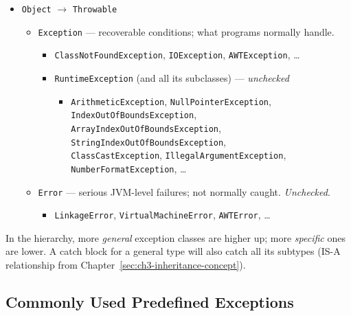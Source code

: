 \documentclass[11pt, a4paper, notitlepage]{report}
\theoremstyle{definition}
\theoremstyle{remark}
\theoremstyle{definition}
\begin{document}
\begin{itemize}
  \item \texttt{Object} $\rightarrow$ \texttt{Throwable}
  \begin{itemize}
    \item \texttt{Exception} --- recoverable conditions; what programs normally handle.
    \begin{itemize}
      \item \texttt{ClassNotFoundException}, \texttt{IOException}, \texttt{AWTException}, \ldots
      \item \texttt{RuntimeException} (and all its subclasses) --- \emph{unchecked}
      \begin{itemize}
        \item \texttt{ArithmeticException}, \texttt{NullPointerException}, \texttt{IndexOutOfBoundsException},\\
              \texttt{ArrayIndexOutOfBoundsException}, \texttt{StringIndexOutOfBoundsException},\\
              \texttt{ClassCastException}, \texttt{IllegalArgumentException}, \texttt{NumberFormatException}, \ldots
      \end{itemize}
    \end{itemize}
    \item \texttt{Error} --- serious JVM-level failures; not normally caught. \emph{Unchecked}.
    \begin{itemize}
      \item \texttt{LinkageError}, \texttt{VirtualMachineError}, \texttt{AWTError}, \ldots
    \end{itemize}
  \end{itemize}
\end{itemize}

In the hierarchy, more \emph{general} exception classes are higher up; more \emph{specific} ones are lower. A catch block for a general type will also catch all its subtypes (IS-A relationship from Chapter~\ref{sec:ch3-inheritance-concept}).

\subsection{Commonly Used Predefined Exceptions}
\label{sec:ch4-predefined}
\end{document}
